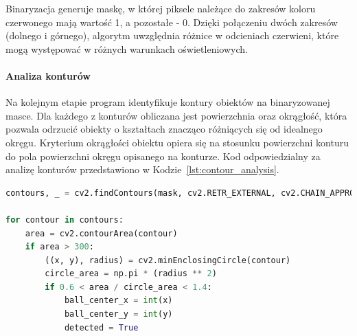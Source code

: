 \documentclass[a4paper,twoside,12pt]{book}
\begin{document}
Binaryzacja generuje maskę, w której piksele należące do zakresów koloru czerwonego mają wartość 1, a pozostałe - 0. Dzięki połączeniu dwóch zakresów (dolnego i górnego), algorytm uwzględnia różnice w odcieniach czerwieni, które mogą występować w różnych warunkach oświetleniowych.

\paragraph{Analiza konturów}
Na kolejnym etapie program identyfikuje kontury obiektów na binaryzowanej masce. Dla każdego z konturów obliczana jest powierzchnia oraz okrągłość, która pozwala odrzucić obiekty o kształtach znacząco różniących się od idealnego okręgu. Kryterium okrągłości obiektu opiera się na stosunku powierzchni konturu do pola powierzchni okręgu opisanego na konturze. Kod odpowiedzialny za analizę konturów przedstawiono w Kodzie~\ref{lst:contour_analysis}.

\begin{lstlisting}[language=Python, caption={Analiza konturów w celu identyfikacji piłki.}, label={lst:contour_analysis}, captionpos=b]
contours, _ = cv2.findContours(mask, cv2.RETR_EXTERNAL, cv2.CHAIN_APPROX_SIMPLE)

for contour in contours:
    area = cv2.contourArea(contour)
    if area > 300:
        ((x, y), radius) = cv2.minEnclosingCircle(contour)
        circle_area = np.pi * (radius ** 2)
        if 0.6 < area / circle_area < 1.4:
            ball_center_x = int(x)
            ball_center_y = int(y)
            detected = True
\end{lstlisting}
\end{document}
